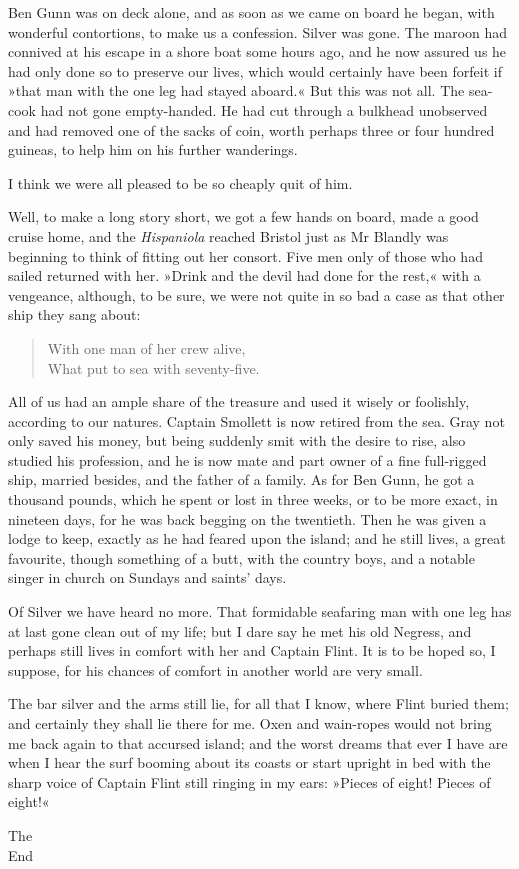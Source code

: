 Ben Gunn was on deck alone, and as soon as we came on board he began, with wonderful contortions, to make us a confession. Silver was gone. The maroon had connived at his escape in a shore boat some hours ago, and he now assured us he had only done so to preserve our lives, which would certainly have been forfeit if »that man with the one leg had stayed aboard.« But this was not all. The sea-cook had not gone empty-handed. He had cut through a bulkhead unobserved and had removed one of the sacks of coin, worth perhaps three or four hundred guineas, to help him on his further wanderings.

I think we were all pleased to be so cheaply quit of him.

Well, to make a long story short, we got a few hands on board, made a good cruise home, and the \textit{Hispaniola} reached Bristol just as Mr Blandly was beginning to think of fitting out her consort. Five men only of those who had sailed returned with her. »Drink and the devil had done for the rest,« with a vengeance, although, to be sure, we were not quite in so bad a case as that other ship they sang about:

\blockquote{
With one man of her crew alive,\\
What put to sea with seventy-five.
}

All of us had an ample share of the treasure and used it wisely or foolishly, according to our natures. Captain Smollett is now retired from the sea. Gray not only saved his money, but being suddenly smit with the desire to rise, also studied his profession, and he is now mate and part owner of a fine full-rigged ship, married besides, and the father of a family. As for Ben Gunn, he got a thousand pounds, which he spent or lost in three weeks, or to be more exact, in nineteen days, for he was back begging on the twentieth. Then he was given a lodge to keep, exactly as he had feared upon the island; and he still lives, a great favourite, though something of a butt, with the country boys, and a notable singer in church on Sundays and saints' days.

Of Silver we have heard no more. That formidable seafaring man with one leg has at last gone clean out of my life; but I dare say he met his old Negress, and perhaps still lives in comfort with her and Captain Flint. It is to be hoped so, I suppose, for his chances of comfort in another world are very small.

The bar silver and the arms still lie, for all that I know, where Flint buried them; and certainly they shall lie there for me. Oxen and wain-ropes would not bring me back again to that accursed island; and the worst dreams that ever I have are when I hear the surf booming about its coasts or start upright in bed with the sharp voice of Captain Flint still ringing in my ears: »Pieces of eight! Pieces of eight!«
\begin{center}
{\HUGE\chapterfont The\\}
\vspace{0.5cm}
{\HUGE\chapterfont End}
\end{center}
